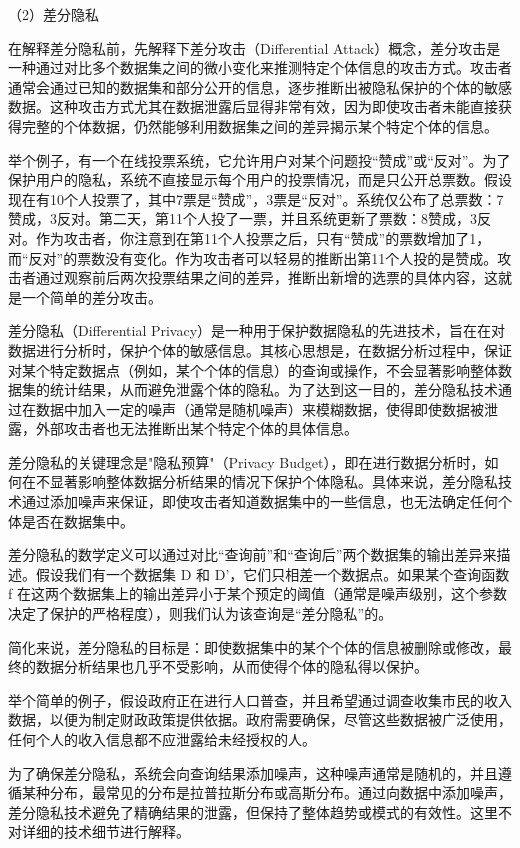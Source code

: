（2）差分隐私

在解释差分隐私前，先解释下差分攻击（Differential Attack）概念，差分攻击是一种通过对比多个数据集之间的微小变化来推测特定个体信息的攻击方式。攻击者通常会通过已知的数据集和部分公开的信息，逐步推断出被隐私保护的个体的敏感数据。这种攻击方式尤其在数据泄露后显得非常有效，因为即使攻击者未能直接获得完整的个体数据，仍然能够利用数据集之间的差异揭示某个特定个体的信息。

举个例子，有一个在线投票系统，它允许用户对某个问题投“赞成”或“反对”。为了保护用户的隐私，系统不直接显示每个用户的投票情况，而是只公开总票数。假设现在有10个人投票了，其中7票是“赞成”，3票是“反对”。系统仅公布了总票数：7赞成，3反对。第二天，第11个人投了一票，并且系统更新了票数：8赞成，3反对。作为攻击者，你注意到在第11个人投票之后，只有“赞成”的票数增加了1，而“反对”的票数没有变化。作为攻击者可以轻易的推断出第11个人投的是赞成。攻击者通过观察前后两次投票结果之间的差异，推断出新增的选票的具体内容，这就是一个简单的差分攻击。

差分隐私（Differential Privacy）是一种用于保护数据隐私的先进技术，旨在在对数据进行分析时，保护个体的敏感信息。其核心思想是，在数据分析过程中，保证对某个特定数据点（例如，某个个体的信息）的查询或操作，不会显著影响整体数据集的统计结果，从而避免泄露个体的隐私。为了达到这一目的，差分隐私技术通过在数据中加入一定的噪声（通常是随机噪声）来模糊数据，使得即使数据被泄露，外部攻击者也无法推断出某个特定个体的具体信息。

差分隐私的关键理念是"隐私预算"（Privacy Budget），即在进行数据分析时，如何在不显著影响整体数据分析结果的情况下保护个体隐私。具体来说，差分隐私技术通过添加噪声来保证，即使攻击者知道数据集中的一些信息，也无法确定任何个体是否在数据集中。

差分隐私的数学定义可以通过对比“查询前”和“查询后”两个数据集的输出差异来描述。假设我们有一个数据集 D 和 D'，它们只相差一个数据点。如果某个查询函数 f 在这两个数据集上的输出差异小于某个预定的阈值（通常是噪声级别，这个参数决定了保护的严格程度），则我们认为该查询是“差分隐私”的。

简化来说，差分隐私的目标是：即使数据集中的某个个体的信息被删除或修改，最终的数据分析结果也几乎不受影响，从而使得个体的隐私得以保护。

举个简单的例子，假设政府正在进行人口普查，并且希望通过调查收集市民的收入数据，以便为制定财政政策提供依据。政府需要确保，尽管这些数据被广泛使用，任何个人的收入信息都不应泄露给未经授权的人。

为了确保差分隐私，系统会向查询结果添加噪声，这种噪声通常是随机的，并且遵循某种分布，最常见的分布是拉普拉斯分布或高斯分布。通过向数据中添加噪声，差分隐私技术避免了精确结果的泄露，但保持了整体趋势或模式的有效性。这里不对详细的技术细节进行解释。

